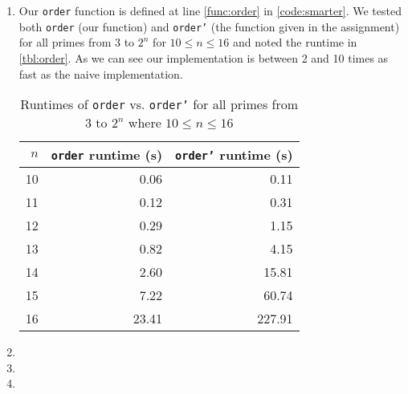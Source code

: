 \documentclass[a4paper]{article}
\begin{document}
\begin{enumerate}
	\item Our \texttt{order} function is defined at line \autoref{func:order} in \autoref{code:smarter}. We tested both \texttt{order} (our function) and \texttt{order'} (the function given in the assignment) for all primes from 3 to $2^n$ for $10 \leq n \leq 16$  and noted the runtime in \autoref{tbl:order}. As we can see our implementation is between 2 and 10 times as fast as the naive implementation.
	
\begin{table}[h]
	\centering
	\caption{Runtimes of \texttt{order} vs. \texttt{order'} for all primes from 3 to $2^n$ where $10 \leq n \leq 16$}
	\label{tbl:order}
	\begin{tabular}{r|r|r}
		$n$ & \texttt{order} runtime (s) & \texttt{order'} runtime (s) \\
		\hline
		10 & 0.06 & 0.11 \\
		11 & 0.12 & 0.31 \\
		12 & 0.29 & 1.15 \\
		13 & 0.82 & 4.15 \\
		14 & 2.60 & 15.81 \\
		15 & 7.22 & 60.74 \\
		16 & 23.41 & 227.91
	\end{tabular}
\end{table}
	\item 
	\item 
	\item 
\end{enumerate}
\end{document}
